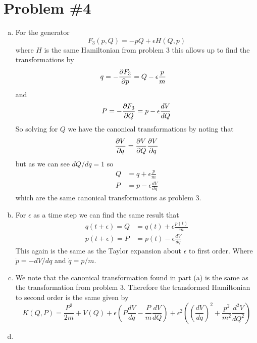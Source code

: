 \documentclass[11pt]{article}
\numberwithin{equation}{section}
\begin{document}
\section{Problem \#4}
\begin{enumerate}[(a)]
\item For the generator 
$$F_3(p,Q) = -pQ + \epsilon{H(Q,p)}$$
where $H$ is the same Hamiltonian from problem 3 this allows up to find the transformations 
by
\begin{align*}
q = -\frac{\partial{F_3}}{\partial{p}} &= Q - \epsilon\frac{p}{m}
\end{align*}
and 
$$P = -\frac{\partial{F_3}}{\partial{Q}} = p - \epsilon\frac{dV}{dQ}$$
So solving for $Q$ we have the canonical transformations by noting that
$$\frac{\partial{V}}{\partial{q}} = \frac{\partial{V}}{\partial{Q}}\frac{\partial{V}}{\partial{q}}$$
but as we can see $dQ/dq =1$ so
\begin{align*}
Q &= q + \epsilon\frac{p}{m}\\
P &= p - \epsilon\frac{dV}{dq}
\end{align*}
which are the same canonical transformations as problem 3.

\item For $\epsilon$ as a time step we can find the same result that
\begin{align*}
q(t+\epsilon) = Q &= q(t) + \epsilon\frac{p(t)}{m}\\
p(t+\epsilon) = P &= p(t) - \epsilon\frac{dV}{dq}
\end{align*}
This again is the same as the Taylor expansion about $\epsilon$ to first order. Where 
$\dot{p} = -dV/dq$ and $\dot{q} = p/m$.

\item We note that the canonical transformation found in part (a) is the same as the 
transformation from problem 3. Therefore the transformed Hamiltonian to second order is the
same given by
$$K(Q,P) = \frac{P^2}{2m} + V(Q) + \epsilon\left(P\frac{dV}{dq}-\frac{P}{m}\frac{dV}{dQ}\right) + \epsilon^2\left(\left(\frac{dV}{dq}\right)^2 + \frac{p^2}{m^2}\frac{d^2V}{dQ^2}\right)$$

\item



\end{enumerate}

\pagebreak
\end{document}
